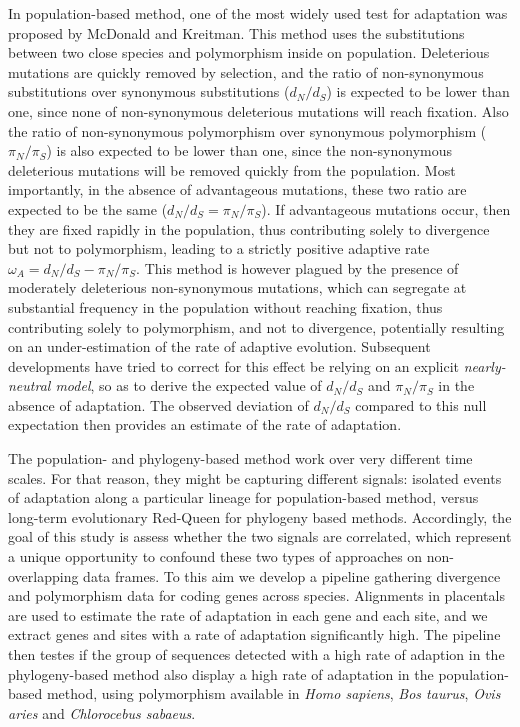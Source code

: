 \documentclass{article}
\newcommand{\dn}{d_N}
\newcommand{\ds}{d_S}
\newcommand{\dnds}{\dn / \ds}
\newcommand{\pn}{\pi_N}
\newcommand{\ps}{\pi_S}
\newcommand{\pnps}{\pn / \ps}
\begin{document}
In population-based method, one of the most widely used test for adaptation was proposed by McDonald and Kreitman\cite{mcdonald_adaptative_1991}.
This method uses the substitutions between two close species and polymorphism inside on population.
Deleterious mutations are quickly removed by selection, and the ratio of non-synonymous substitutions over synonymous substitutions ($\dnds$) is expected to be lower than one, since none of non-synonymous deleterious mutations will reach fixation.
Also the ratio of non-synonymous polymorphism over synonymous polymorphism ($\pnps$) is also expected to be lower than one, since the non-synonymous deleterious mutations will be removed quickly from the population.
Most importantly, in the absence of advantageous mutations, these two ratio are expected to be the same ($\dnds=\pnps$).
If advantageous mutations occur, then they are fixed rapidly in the population, thus contributing solely to divergence but not to polymorphism, leading to a strictly positive adaptive rate $\omega_A = \dnds-\pnps$\cite{smith_adaptive_2002}.
This method is however plagued by the presence of moderately deleterious non-synonymous mutations, which can segregate at substantial frequency in the population without reaching fixation, thus contributing solely to polymorphism, and not to divergence, potentially resulting on an under-estimation of the rate of adaptive evolution\cite{eyre-walker_quantifying_2002}.
Subsequent developments have tried to correct for this effect be relying on an explicit \textit{nearly-neutral model}, so as to derive the expected value of $\dnds$ and $\pnps$ in the absence of adaptation.
The observed deviation of $\dnds$ compared to this null expectation then provides an estimate of the rate of adaptation\cite{eyre-walker_estimating_2009, galtier_adaptive_2016}.

The population- and phylogeny-based method work over very different time scales.
For that reason, they might be capturing different signals: isolated events of adaptation along a particular lineage for population-based method, versus long-term evolutionary Red-Queen for phylogeny based methods.
Accordingly, the goal of this study is assess whether the two signals are correlated, which represent a unique opportunity to confound these two types of approaches on non-overlapping data frames.
To this aim we develop a pipeline gathering divergence and polymorphism data for coding genes across species.
Alignments in placentals are used to estimate the rate of adaptation in each gene and each site, and we extract genes and sites with a rate of adaptation significantly high.
The pipeline then testes if the group of sequences detected with a high rate of adaption in the phylogeny-based method also display a high rate of adaptation in the population-based method, using polymorphism available in \textit{Homo sapiens}, \textit{Bos taurus}, \textit{Ovis aries} and \textit{Chlorocebus sabaeus}.
\end{document}
